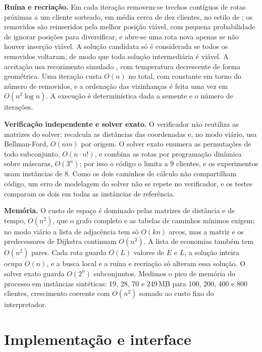\documentclass[12pt]{article}
\begin{document}
\textbf{Ruína e recriação.} Em cada iteração removem-se trechos contíguos de rotas próximas a um cliente sorteado, em média cerca de dez clientes, no estilo de \cite{christiaens2020}; os removidos são reinseridos pela melhor posição viável, com pequena probabilidade de ignorar posições para diversificar, e abre-se uma rota nova apenas se não houver inserção viável. A solução candidata só é considerada se todos os removidos voltaram, de modo que toda solução intermediária é viável. A aceitação usa recozimento simulado \cite{kirkpatrick1983}, com temperatura decrescente de forma geométrica. Uma iteração custa $O(n)$ no total, com constante em torno do número de removidos, e a ordenação das vizinhanças é feita uma vez em $O(n^2\log n)$. A execução é determinística dada a semente e o número de iterações.

\textbf{Verificação independente e solver exato.} O verificador não reutiliza as matrizes do solver: recalcula as distâncias das coordenadas e, no modo viário, usa Bellman-Ford, $O(nm)$ por origem. O solver exato enumera as permutações de todo subconjunto, $O(n\cdot n!)$, e combina as rotas por programação dinâmica sobre máscaras, $O(3^n)$; por isso o código o limita a 9 clientes, e os experimentos usam instâncias de 8. Como os dois caminhos de cálculo não compartilham código, um erro de modelagem do solver não se repete no verificador, e os testes comparam os dois em todas as instâncias de referência.

\textbf{Memória.} O custo de espaço é dominado pelas matrizes de distância e de tempo, $O(n^2)$, que o grafo completo e as tabelas de caminhos mínimos exigem; no modo viário a lista de adjacência tem só $O(kn)$ arcos, mas a matriz e os predecessores de Dijkstra continuam $O(n^2)$. A lista de economias também tem $O(n^2)$ pares. Cada rota guarda $O(L)$ valores de $E$ e $L$, a solução inteira ocupa $O(n)$, e a busca local e a ruína e recriação só alteram essa solução. O solver exato guarda $O(2^n)$ subconjuntos. Medimos o pico de memória do processo em instâncias sintéticas: 19, 28, 70 e 249\,MB para 100, 200, 400 e 800 clientes, crescimento coerente com $O(n^2)$ somado ao custo fixo do interpretador.

\section{Implementação e interface}
\end{document}
